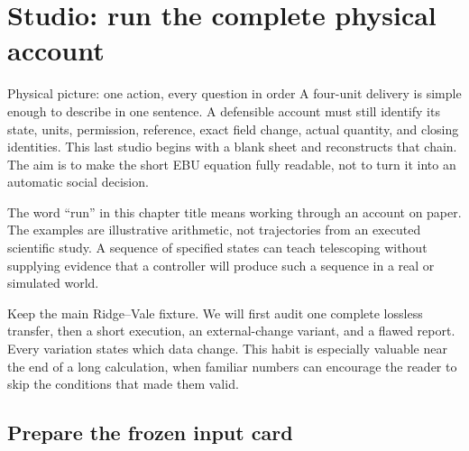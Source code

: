 \chapter{Studio: run the complete physical account}\label{ch:studio-account}

\begin{intuitionbox}{Physical picture: one action, every question in order}
A four-unit delivery is simple enough to describe in one sentence. A defensible account must still identify its state, units, permission, reference, exact field change, actual quantity, and closing identities. This last studio begins with a blank sheet and reconstructs that chain. The aim is to make the short EBU equation fully readable, not to turn it into an automatic social decision.
\end{intuitionbox}

The word ``run'' in this chapter title means working through an account on paper. The examples are illustrative arithmetic, not trajectories from an executed scientific study. A sequence of specified states can teach telescoping without supplying evidence that a controller will produce such a sequence in a real or simulated world.

Keep the main Ridge--Vale fixture. We will first audit one complete lossless transfer, then a short execution, an external-change variant, and a flawed report. Every variation states which data change. This habit is especially valuable near the end of a long calculation, when familiar numbers can encourage the reader to skip the conditions that made them valid.

\section{Prepare the frozen input card}

